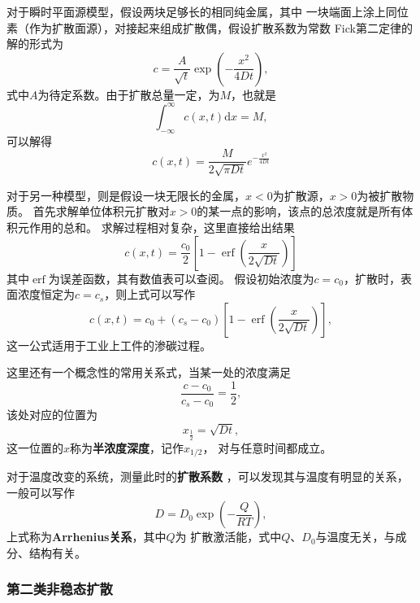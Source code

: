                 对于瞬时平面源模型，假设两块足够长的相同纯金属，其中
                一块端面上涂上同位素（作为扩散面源），对接起来组成扩散偶，假设扩散系数为常数
                Fick第二定律的解的形式为
                \begin{equation}
                    c=\frac{A}{\sqrt{t}} \exp \left(-\frac{x^{2}}{4 D t}\right),
                \end{equation}
                式中$A$为待定系数。由于扩散总量一定，为$M$，也就是
                \begin{equation}
                    \int_{-\infty}^{\infty} c(x, t) \mathrm{d} x=M,
                \end{equation}
                可以解得
                \begin{equation}
                    c(x, t)=\frac{M}{2 \sqrt{\pi D t}} e^{-\frac{x^{2}}{4 D t}}
                \end{equation}

                对于另一种模型，则是假设一块无限长的金属，$x<0$为扩散源，$x>0$为被扩散物质。
                首先求解单位体积元扩散对$x>0$的某一点的影响，该点的总浓度就是所有体积元作用的总和。
                求解过程相对复杂，这里直接给出结果
                \begin{equation}
                    c(x, t)=\frac{c_{0}}{2}\left[1-\operatorname{erf}\left(\frac{x}{2 \sqrt{D t}}\right)\right]
                \end{equation}
                其中$\operatorname{erf}$为误差函数，其有数值表可以查阅。
                假设初始浓度为$c=c_0$，扩散时，表面浓度恒定为$c=c_s$，则上式可以写作
                \begin{equation}
                    c(x,t)=c_0+(c_s-c_0)\left[ 1-\operatorname{erf}\left( \frac{x}{2\sqrt{Dt}} \right) \right],
                \end{equation}
                这一公式适用于工业上工件的渗碳过程。

                这里还有一个概念性的常用关系式，当某一处的浓度满足
                \begin{equation}
                    \frac{c-c_{0}}{c_{s}-c_{0}}=\frac{1}{2},
                \end{equation}
                该处对应的位置为
                \begin{equation}
                    x_{\frac{1}{2}}=\sqrt{Dt},
                \end{equation}
                这一位置的$x$称为\textbf{半浓度深度}，记作$x_{1/2}$，
                对与任意时间都成立。

                对于温度改变的系统，测量此时的\textbf{扩散系数} ，可以发现其与温度有明显的关系，一般可以写作
                \begin{equation}
                    D=D_0\exp\left( -\frac{Q}{RT} \right),
                \end{equation}
                上式称为\textbf{Arrhenius关系}，其中$Q$为
                扩散激活能，式中$Q$、$D_0$与温度无关，与成分、结构有关。
            \subsubsection{第二类非稳态扩散}